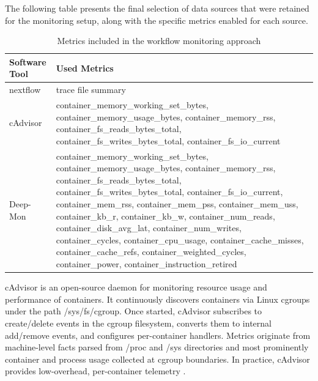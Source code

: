 The following table presents the final selection of data sources that were retained for the monitoring setup, along with the specific metrics enabled for each source.

\begin{table}[H]
    \centering
    \renewcommand{\arraystretch}{1.2}
    \setlength{\tabcolsep}{8pt}
    \small
    \begin{tabularx}{\textwidth}{
            >{\raggedright\arraybackslash}X
            >{\raggedright\arraybackslash}X
        }
        \toprule
        \textbf{Software Tool} & \textbf{Used Metrics} \\
        \midrule

        nextflow               &
        trace file summary                             \\

        \midrule
        cAdvisor               &
        container\_memory\_working\_set\_bytes,
        container\_memory\_usage\_bytes,
        container\_memory\_rss,
        container\_fs\_reads\_bytes\_total,
        container\_fs\_writes\_bytes\_total,
        container\_fs\_io\_current                     \\

        \midrule
        Deep-Mon               &
        container\_memory\_working\_set\_bytes,
        container\_memory\_usage\_bytes,
        container\_memory\_rss,
        container\_fs\_reads\_bytes\_total,
        container\_fs\_writes\_bytes\_total,
        container\_fs\_io\_current,
        container\_mem\_rss,
        container\_mem\_pss,
        container\_mem\_uss,
        container\_kb\_r,
        container\_kb\_w,
        container\_num\_reads,
        container\_disk\_avg\_lat,
        container\_num\_writes,
        container\_cycles,
        container\_cpu\_usage,
        container\_cache\_misses,
        container\_cache\_refs,
        container\_weighted\_cycles,
        container\_power,
        container\_instruction\_retired                \\

        \bottomrule
    \end{tabularx}%
    \small
    \caption{Metrics included in the workflow monitoring approach}
    \label{tab:monitoring-metrics}
\end{table}

cAdvisor is an open-source daemon for monitoring resource usage and performance of containers. It continuously discovers containers via Linux cgroups under the path /sys/fs/cgroup. Once started, cAdvisor subscribes to create/delete events in the cgroup filesystem, converts them to internal add/remove events, and configures per-container handlers. Metrics originate from machine-level facts parsed from /proc and /sys directories and most prominently container and process usage collected at cgroup boundaries. In practice, cAdvisor provides low-overhead, per-container telemetry \cite{cadvisor_github_2025}.

